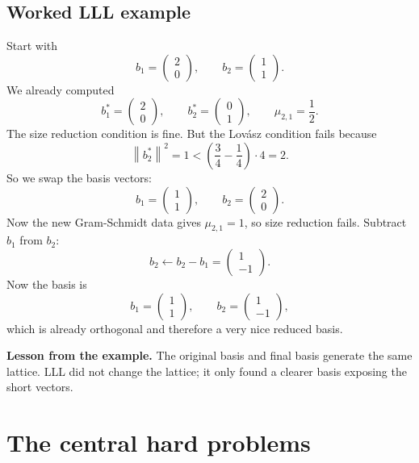 \documentclass[11pt]{article}
\newenvironment{greenboxenv}{%
  \def\FrameCommand{\fboxrule=0.8pt \fboxsep=8pt \colorbox{greenbox}}%
  \MakeFramed{\advance\hsize-\width \FrameRestore}}{\endMakeFramed}
\newcommand{\norm}[1]{\left\lVert #1 \right\rVert}
\begin{document}
\subsection{Worked LLL example}
Start with
\[
b_1=\begin{pmatrix}2\\0\end{pmatrix},
\qquad
b_2=\begin{pmatrix}1\\1\end{pmatrix}.
\]
We already computed
\[
b_1^*=\begin{pmatrix}2\\0\end{pmatrix},
\qquad
b_2^*=\begin{pmatrix}0\\1\end{pmatrix},
\qquad
\mu_{2,1}=\frac12.
\]
The size reduction condition is fine. But the Lov\'asz condition fails because
\[
\norm{b_2^*}^2 = 1 < \left(\frac34-\frac14\right)\cdot 4 = 2.
\]
So we swap the basis vectors:
\[
b_1=\begin{pmatrix}1\\1\end{pmatrix},
\qquad
b_2=\begin{pmatrix}2\\0\end{pmatrix}.
\]
Now the new Gram-Schmidt data gives $\mu_{2,1}=1$, so size reduction fails. Subtract $b_1$ from $b_2$:
\[
b_2 \leftarrow b_2-b_1 = \begin{pmatrix}1\\-1\end{pmatrix}.
\]
Now the basis is
\[
b_1=\begin{pmatrix}1\\1\end{pmatrix},
\qquad
b_2=\begin{pmatrix}1\\-1\end{pmatrix},
\]
which is already orthogonal and therefore a very nice reduced basis.

\begin{greenboxenv}
\textbf{Lesson from the example.} The original basis and final basis generate the same lattice. LLL did not change the lattice; it only found a clearer basis exposing the short vectors.
\end{greenboxenv}

\section{The central hard problems}
\end{document}
